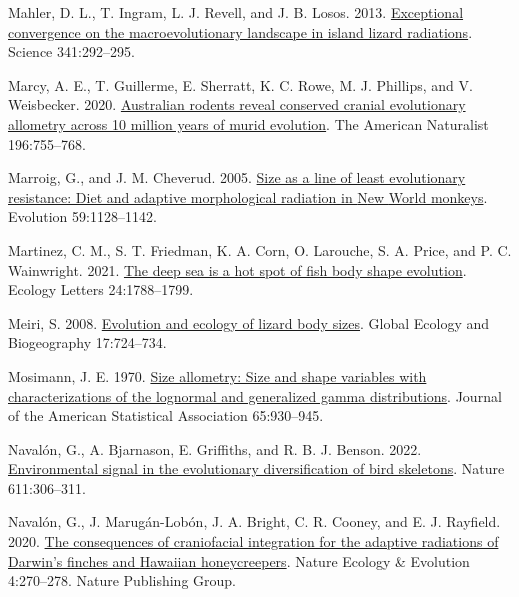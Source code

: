 \documentclass[
  11pt,
]{article}
\newlength{\cslhangindent}
\newlength{\cslentryspacingunit} %
\newenvironment{CSLReferences}[2] %
 {%
  \setlength{\parindent}{0pt}
  \ifodd #1
  \let\oldpar\par
  \def\par{\hangindent=\cslhangindent\oldpar}
  \fi
  \setlength{\parskip}{#2\cslentryspacingunit}
 }%
 {}
\begin{document}
\begin{CSLReferences}{1}{0}
\leavevmode{}%
Mahler, D. L., T. Ingram, L. J. Revell, and J. B. Losos. 2013.
\href{https://doi.org/10.1126/science.1232392}{Exceptional convergence
on the macroevolutionary landscape in island lizard radiations}. Science
341:292--295.

\leavevmode{}%
Marcy, A. E., T. Guillerme, E. Sherratt, K. C. Rowe, M. J. Phillips, and
V. Weisbecker. 2020. \href{https://doi.org/10.1086/711398}{Australian
rodents reveal conserved cranial evolutionary allometry across 10
million years of murid evolution}. The American Naturalist 196:755--768.

\leavevmode{}%
Marroig, G., and J. M. Cheverud. 2005.
\href{https://doi.org/10.1111/j.0014-3820.2005.tb01049.x}{Size as a line
of least evolutionary resistance: Diet and adaptive morphological
radiation in {N}ew {W}orld monkeys}. Evolution 59:1128--1142.

\leavevmode{}%
Martinez, C. M., S. T. Friedman, K. A. Corn, O. Larouche, S. A. Price,
and P. C. Wainwright. 2021. \href{https://doi.org/10.1111/ele.13785}{The
deep sea is a hot spot of fish body shape evolution}. Ecology Letters
24:1788--1799.

\leavevmode{}%
Meiri, S. 2008.
\href{https://doi.org/10.1111/j.1466-8238.2008.00414.x}{Evolution and
ecology of lizard body sizes}. Global Ecology and Biogeography
17:724--734.

\leavevmode{}%
Mosimann, J. E. 1970.
\href{https://doi.org/10.1080/01621459.1970.10481136}{Size allometry:
Size and shape variables with characterizations of the lognormal and
generalized gamma distributions}. Journal of the American Statistical
Association 65:930--945.

\leavevmode{}%
Navalón, G., A. Bjarnason, E. Griffiths, and R. B. J. Benson. 2022.
\href{https://doi.org/10.1038/s41586-022-05372-y}{{Environmental signal
in the evolutionary diversification of bird skeletons}}. Nature
611:306--311.

\leavevmode{}%
Navalón, G., J. Marugán-Lobón, J. A. Bright, C. R. Cooney, and E. J.
Rayfield. 2020. \href{https://doi.org/10.1038/s41559-019-1092-y}{The
consequences of craniofacial integration for the adaptive radiations of
{D}arwin's finches and {H}awaiian honeycreepers}. Nature Ecology \&
Evolution 4:270--278. Nature Publishing Group.


\end{CSLReferences}
\end{document}
